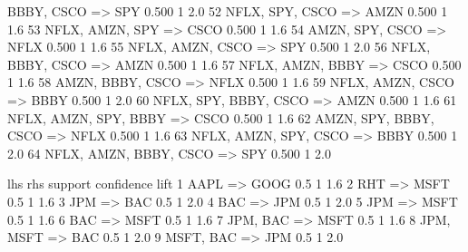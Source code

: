 \documentclass{article}
\begin{document}
\begin{Schunk}
\begin{Soutput}
{    BBBY,                                  
    CSCO} => {SPY}    0.500          1  2.0
52 {NFLX,                                  
    SPY,                                   
    CSCO} => {AMZN}   0.500          1  1.6
53 {NFLX,                                  
    AMZN,                                  
    SPY}  => {CSCO}   0.500          1  1.6
54 {AMZN,                                  
    SPY,                                   
    CSCO} => {NFLX}   0.500          1  1.6
55 {NFLX,                                  
    AMZN,                                  
    CSCO} => {SPY}    0.500          1  2.0
56 {NFLX,                                  
    BBBY,                                  
    CSCO} => {AMZN}   0.500          1  1.6
57 {NFLX,                                  
    AMZN,                                  
    BBBY} => {CSCO}   0.500          1  1.6
58 {AMZN,                                  
    BBBY,                                  
    CSCO} => {NFLX}   0.500          1  1.6
59 {NFLX,                                  
    AMZN,                                  
    CSCO} => {BBBY}   0.500          1  2.0
60 {NFLX,                                  
    SPY,                                   
    BBBY,                                  
    CSCO} => {AMZN}   0.500          1  1.6
61 {NFLX,                                  
    AMZN,                                  
    SPY,                                   
    BBBY} => {CSCO}   0.500          1  1.6
62 {AMZN,                                  
    SPY,                                   
    BBBY,                                  
    CSCO} => {NFLX}   0.500          1  1.6
63 {NFLX,                                  
    AMZN,                                  
    SPY,                                   
    CSCO} => {BBBY}   0.500          1  2.0
64 {NFLX,                                  
    AMZN,                                  
    BBBY,                                  
    CSCO} => {SPY}    0.500          1  2.0
\end{Soutput}
\begin{Soutput}
  lhs       rhs    support confidence lift
1 {AAPL} => {GOOG}     0.5          1  1.6
2 {RHT}  => {MSFT}     0.5          1  1.6
3 {JPM}  => {BAC}      0.5          1  2.0
4 {BAC}  => {JPM}      0.5          1  2.0
5 {JPM}  => {MSFT}     0.5          1  1.6
6 {BAC}  => {MSFT}     0.5          1  1.6
7 {JPM,                                   
   BAC}  => {MSFT}     0.5          1  1.6
8 {JPM,                                   
   MSFT} => {BAC}      0.5          1  2.0
9 {MSFT,                                  
   BAC}  => {JPM}      0.5          1  2.0
\end{Soutput}
\end{Schunk}
\end{document}
